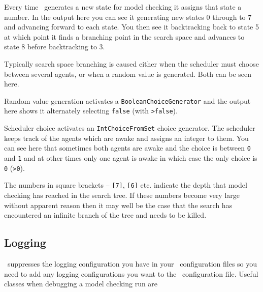 \documentclass[a4]{article}
\begin{document}
Every time \jpf\ generates a new state for model checking it assigns that state a number.  In the output here you can see it generating new states 0 through to 7 and advancing forward to each state.  You then see it backtracking back to state 5 at which point it finds a branching point in the search space and advances to state 8 before backtracking to 3.

Typically search space branching is caused either when the scheduler must choose between several agents, or when a random value is generated.  Both can be seen here.

Random value generation activates a \texttt{BooleanChoiceGenerator} and the output here shows it alternately selecting  \texttt{false} (with \texttt{>false}).

Scheduler choice activates an \texttt{IntChoiceFromSet} choice generator.  The scheduler keeps track of the agents which are awake and assigns an integer to them.  You can see here that sometimes both agents are awake and the choice is between \texttt{0} and \texttt{1} and at other times only one agent is awake in which case the only choice is \texttt{0} (\texttt{>0}).

The numbers in square brackets -- \texttt{[7]}, \texttt{[6]} etc. indicate the depth that model checking has reached in the search tree.  If these numbers become very large without apparent reason then it may well be the case that the search has encountered an infinite branch of the tree and needs to be killed.

\subsection{Logging}
\jpf\ suppresses the logging configuration you have in your \ail\ configuration files so you need to add any logging configurations you want to the \jpf\ configuration file.  Useful classes when debugging a model checking run are
\end{document}
